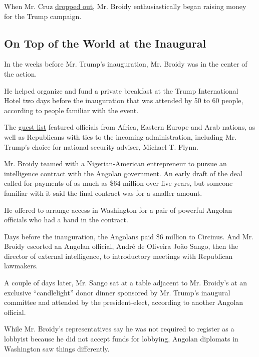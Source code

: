 When Mr. Cruz
\href{https://www.nytimes.com/2016/05/04/us/politics/ted-cruz.html?module=inline}{dropped
out}, Mr. Broidy enthusiastically began raising money for the Trump
campaign.

\hypertarget{on-top-of-the-world-at-the-inaugural}{%
\subsection{On Top of the World at the
Inaugural}\label{on-top-of-the-world-at-the-inaugural}}

In the weeks before Mr. Trump's inauguration, Mr. Broidy was in the
center of the action.

He helped organize and fund a private breakfast at the Trump
International Hotel two days before the inauguration that was attended
by 50 to 60 people, according to people familiar with the event.

The
\href{https://www.thedailybeast.com/mueller-probes-an-event-with-nunes-flynn-and-foreign-officials-at-trumps-dc-hotel}{guest
list} featured officials from Africa, Eastern Europe and Arab nations,
as well as Republicans with ties to the incoming administration,
including Mr. Trump's choice for national security adviser, Michael T.
Flynn.

Mr. Broidy teamed with a Nigerian-American entrepreneur to pursue an
intelligence contract with the Angolan government. An early draft of the
deal called for payments of as much as \$64 million over five years, but
someone familiar with it said the final contract was for a smaller
amount.

He offered to arrange access in Washington for a pair of powerful
Angolan officials who had a hand in the contract.

Days before the inauguration, the Angolans paid \$6 million to Circinus.
And Mr. Broidy escorted an Angolan official, André de Oliveira João
Sango, then the director of external intelligence, to introductory
meetings with Republican lawmakers.

A couple of days later, Mr. Sango sat at a table adjacent to Mr.
Broidy's at an exclusive ``candlelight'' donor dinner sponsored by Mr.
Trump's inaugural committee and attended by the president-elect,
according to another Angolan official.

While Mr. Broidy's representatives say he was not required to register
as a lobbyist because he did not accept funds for lobbying, Angolan
diplomats in Washington saw things differently.

